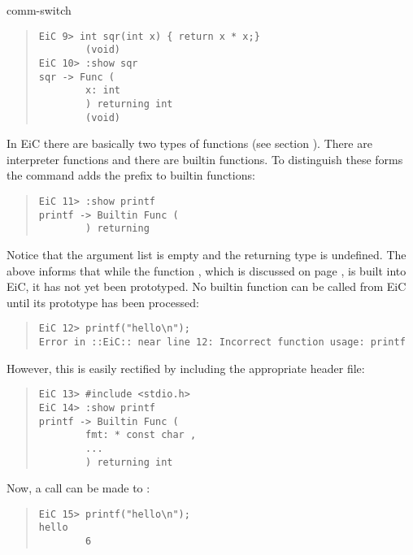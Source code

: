 \begin{Ventry}{comm-switch }
\begin{quote}
\begin{verbatim}
EiC 9> int sqr(int x) { return x * x;}
        (void)
EiC 10> :show sqr
sqr -> Func (
        x: int 
        ) returning int 
        (void)
\end{verbatim}
\end{quote}

In EiC there are basically two types of functions (see section
). There are interpreter
functions and there are builtin
functions. To distinguish these forms the
 command adds the prefix
 to builtin functions:

\begin{quote}
\begin{verbatim}
EiC 11> :show printf
printf -> Builtin Func (
        ) returning 
\end{verbatim}
\end{quote}

Notice that the argument list is empty and the returning type is
undefined. The above informs that while the function , which
is discussed on page \pageref{item:printf}, is built
into EiC, it has not yet been prototyped.  No builtin function can be
called from EiC until its prototype has been processed:

\begin{quote}
\begin{verbatim}
EiC 12> printf("hello\n");
Error in ::EiC:: near line 12: Incorrect function usage: printf
\end{verbatim}
\end{quote}

However, this is easily rectified by including the appropriate header
file:

\begin{quote}
\begin{verbatim}
EiC 13> #include <stdio.h>
EiC 14> :show printf
printf -> Builtin Func (
        fmt: * const char ,
        ...
        ) returning int 
\end{verbatim}
\end{quote}

Now, a call can be made to :

\begin{quote}
\begin{verbatim}
EiC 15> printf("hello\n");
hello
        6
\end{verbatim}
\end{quote}


\end{Ventry}
